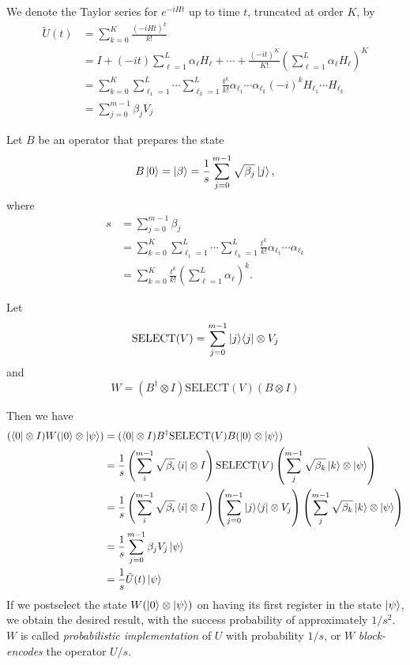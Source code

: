 \documentclass[11pt, oneside]{article}   	%
\begin{document}
We denote the Taylor series for $e^{-i H t}$ up to time $t$, truncated at order $K$, by
\begin{align*} 
\tilde{U}(t) 
&= \sum^K_{k = 0} \frac{(-iHt)^k}{k!} \\
&= I + (-it) \sum^L_{\ell = 1} \alpha_{\ell} H_{\ell} + \cdots + \frac{(-it)^K}{K!} \left( \sum^L_{\ell = 1} \alpha_{\ell} H_{\ell} \right)^K \\
&= \sum^K_{k = 0} \sum^L_{\ell_1 = 1} \cdots \sum^L_{\ell_k = 1} \frac{t^k}{k!} \alpha_{\ell_1} \cdots \alpha_{\ell_k} (-i)^k H_{\ell_1} \cdots H_{\ell_k} \\
&= \sum^{m-1}_{j = 0} \beta_j V_j
\end{align*}

Let $B$ be an operator that prepares the state
\begin{equation*} 
B \ket{0} = \ket{\beta} = \frac{1}{s} \sum^{m-1}_{j = 0} \sqrt{\beta_j} \ket{j},
\end{equation*}
where 
\begin{align*} 
s 
&= \sum^{m-1}_{j = 0} \beta_j \\
&= \sum^K_{k = 0} \sum^L_{\ell_1 = 1} \cdots \sum^L_{\ell_k = 1} \frac{t^k}{k!} \alpha_{\ell_1} \cdots \alpha_{\ell_k} \\
&= \sum^K_{k = 0}  \frac{t^k}{k!} \left( \sum^L_{\ell = 1} \alpha_{\ell} \right)^k.
\end{align*}

Let 
\begin{equation*} 
\textrm{SELECT}(V) = \sum^{m-1}_{j = 0} \ket{j} \! \bra{j} \otimes V_j
\end{equation*}
and 
\begin{equation*} 
W = (B^{\dagger} \otimes I) \textrm{SELECT}(V) (B \otimes I)
\end{equation*}

Then we have 
\begin{align*} 
(\bra{0} \otimes I) W (\ket{0} \otimes \ket{\psi}) 
&= (\bra{0} \otimes I) B^{\dagger} \textrm{SELECT}(V) B (\ket{0} \otimes \ket{\psi}) \\
&= \frac{1}{s} \left( \sum^{m-1}_i \sqrt{\beta_i} \bra{i} \otimes I \right) \textrm{SELECT}(V) \left( \sum^{m-1}_j \sqrt{\beta_k} \ket{k} \otimes \ket{\psi} \right) \\
&= \frac{1}{s} \left( \sum^{m-1}_i \sqrt{\beta_i} \bra{i} \otimes I \right) \left( \sum^{m-1}_{j = 0} \ket{j} \! \bra{j} \otimes V_j \right) \left( \sum^{m-1}_j \sqrt{\beta_k} \ket{k} \otimes \ket{\psi} \right) \\
&= \frac{1}{s} \sum^{m-1}_{j = 0} \beta_j V_j \ket{\psi} \\
&= \frac{1}{s} \tilde{U}(t) \ket{\psi}
\end{align*}
If we postselect the state $W (\ket{0} \otimes \ket{\psi})$ on having its first register in the state $\ket{\psi}$, we obtain the desired result, with the success probability of approximately $1/s^2$.
$W$ is called \textit{probabilistic implementation} of $U$ with probability $1/s$, or $W$ \textit{block-encodes} the operator $U/s$.
\end{document}
